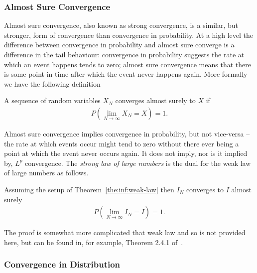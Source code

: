 \subsubsection{Almost Sure Convergence}
\label{sec:inf:mc:conv:as}

Almost sure convergence, also known as strong convergence, is a similar, but stronger, form of convergence than convergence in
probability.  At a high level the difference between
convergence in probability and almost sure converge is a difference in the tail behaviour:
convergence in probability suggests the rate at which an event happens tends to zero; almost
sure convergence means that there is some point in time after which the event never happens
again.  More formally we have the following definition
\begin{definition}
A sequence of random variables $X_N$ converges almost surely to $X$ if
\begin{align}
	P\left(\lim\limits_{N\rightarrow\infty} X_N=X\right)=1.
\end{align}
\end{definition}
Almost sure convergence implies convergence in probability, but not vice-versa -- the rate
at which events occur might tend to zero without there ever being a point at which the
event never occurs again.  It does not imply, nor is it implied by, $L^p$ convergence.
The \emph{strong law of large numbers} is the dual for the weak law of large numbers as
follows.
\begin{theorem}
	Assuming the setup of Theorem~\ref{the:inf:weak-law} then $I_N$ converges to $I$ almost surely
	\begin{align}
	P\left(\lim\limits_{N\rightarrow\infty} I_N=I\right)=1.
	\end{align}
\end{theorem}
The proof is somewhat more complicated that weak law and so is not provided here, but can
be found in, for example, Theorem 2.4.1 of~\cite{durrett2010probability}.

\subsubsection{Convergence in Distribution}
\label{sec:inf:mc:conv:dist}

